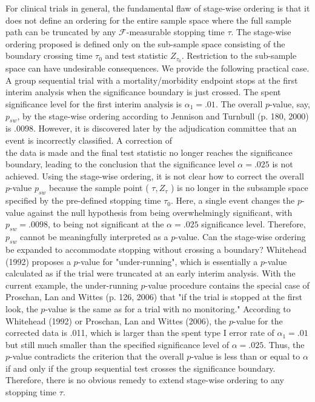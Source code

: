 \documentclass[10pt]{article}
\begin{document}
For clinical trials in general, the fundamental flaw of stage-wise ordering is that it does not define an ordering for the entire sample space where the full sample path can be truncated by any $\mathcal{F}$-measurable stopping time $\tau$. The stage-wise ordering proposed is defined only on the sub-sample space consisting of the boundary crossing time $\tau_{0}$ and test statistic $Z_{\tau_{0}}$. Restriction to the sub-sample space can have undesirable consequences. We provide the following practical case. A group sequential trial with a mortality/morbidity endpoint stops at the first interim analysis when the significance boundary is just crossed. The spent significance level for the first interim analysis is $\alpha_{1}=.01$. The overall $p$-value, say, $p_{s w}$, by the stage-wise ordering according to Jennison and Turnbull (p. 180, 2000) is .0098. However, it is discovered later by the adjudication committee that an event is incorrectly classified. A correction of\\
the data is made and the final test statistic no longer reaches the significance boundary, leading to the conclusion that the significance level $\alpha=.025$ is not achieved. Using the stage-wise ordering, it is not clear how to correct the overall $p$-value $p_{s w}$ because the sample point ( $\tau, Z_{\tau}$ ) is no longer in the subsample space specified by the pre-defined stopping time $\tau_{0}$. Here, a single event changes the $p$-value against the null hypothesis from being overwhelmingly significant, with $p_{s w}=.0098$, to being not significant at the $\alpha=.025$ significance level. Therefore, $p_{s w}$ cannot be meaningfully interpreted as a $p$-value. Can the stage-wise ordering be expanded to accommodate stopping without crossing a boundary? Whitehead (1992) proposes a $p$-value for "under-running", which is essentially a $p$-value calculated as if the trial were truncated at an early interim analysis. With the current example, the under-running $p$-value procedure contains the special case of Proschan, Lan and Wittes (p. 126, 2006) that "if the trial is stopped at the first look, the $p$-value is the same as for a trial with no monitoring." According to Whitehead (1992) or Proschan, Lan and Wittes (2006), the $p$-value for the corrected data is .011, which is larger than the spent type I error rate of $\alpha_{1}=.01$ but still much smaller than the specified significance level of $\alpha=.025$. Thus, the $p$-value contradicts the criterion that the overall $p$-value is less than or equal to $\alpha$ if and only if the group sequential test crosses the significance boundary. Therefore, there is no obvious remedy to extend stage-wise ordering to any stopping time $\tau$.
\end{document}
